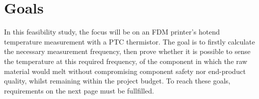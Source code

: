 \chapter*{Goals}
In this feasibility study, the focus will be on an FDM
printer's hotend
temperature measurement with a PTC thermistor.
The goal is to firstly calculate the necessary measurement
frequency, then prove whether it is possible to sense the
temperature at this required frequency, of the component in
which the raw material
would melt without compromising component safety nor
end-product quality,
whilst remaining within the project budget. To reach these
goals, requirements on the next page must be fullfilled.